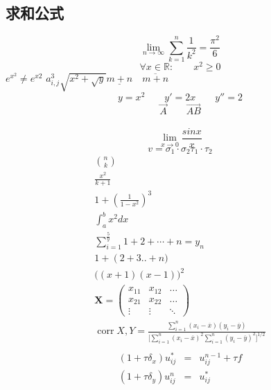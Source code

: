\documentclass[11pt]{article}
\begin{document}
\begin{CJK}{UTF8}{gbsn}
\subsection{求和公式}
\begin{displaymath}
	\lim_{n \to \infty}
	\sum_{k=1}^n \frac{1}{k^2}=\frac{\pi^2}{6}
\end{displaymath}
\begin{equation}\label{equ:zhengming}
	\forall x\in \mathbb{R}: \qquad x^2\geq 0
\end{equation}
$e^{x^2}\neq e^{x2}$\qquad
$a_{i,j}^3$\qquad $\sqrt{x^2+\sqrt{y}}$\qquad$\underline{m+n}\quad\overline{m+n}\qquad$\\
\begin{displaymath}
	y=x^2\qquad y'=2x\qquad y''=2
\end{displaymath}
\begin{displaymath}
	\vec A\qquad\overrightarrow{AB}
\end{displaymath}\\
\[\lim_{x \rightarrow 0}\frac{sinx}{x}
\]
\[v=\sigma_1\cdot\sigma_2\tau_1\cdot\tau_2 
\]
\begin{displaymath}
\begin{split}
	{n \choose k}\\[4pt]
\frac{x^2}{k+1}\label{equ:gongshi}\\
1+\left(\frac{1}{1-x^2}\right)^3\\
\int_a^b{x^2dx}\\
\sum_{i=1}^{\frac{5}{y}}{1+2+\cdots+n=y_n}\\
1+\left(2+3..+n )\right.\\
\Big((x+1)(x-1)\Big)^2\\
\mathbf{X}=
\left(\begin{array}{c|c|c}
x_{11} & x_{12} & \ldots\\
x_{21} & x_{22} & \ldots\\
\vdots & \vdots & \ddots \end{array}\right)\\
\mathop{\mathrm{corr}}{X,Y}=
\frac{\displaystyle\sum_{i=1}^n(x_i-\overline x)(y_i-\overline y)}{\displaystyle\biggl[ \sum_{i=1}^n(x_i-\overline x)^2\sum_{i=1}^n(y_i-\overline y)^2\biggr]^{1/2}}\\
\end{split}
\end{displaymath}
\begin{eqnarray}
	\label{equ:equo}(1+\tau\delta_x)u_{ij}^* & = & u_{ij}^{n-1}+\tau f\\
	(1+\tau\delta_y)u_{ij}^n & = & u_{ij}^*

\end{eqnarray}
\end{CJK}
\end{document}
